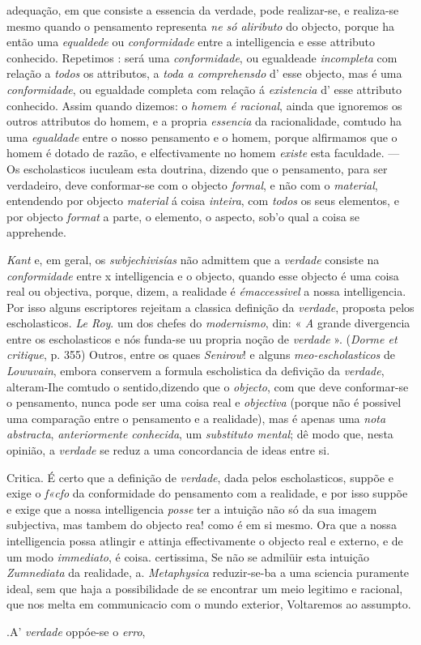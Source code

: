 adequação, em que consiste a essencia da verdade, pode realizar-se, e realiza-se mesmo quando o pensamento representa \emph{ne só aliributo} do objecto, porque ha então uma \emph{equaldede} ou \emph{conformidade} entre a intelligencia e esse attributo conhecido. Repetimos : será uma \emph{conformidade}, ou egualdeade \emph{incompleta} com relação a \emph{todos} os attributos, a \emph{toda a comprehensdo} d' esse objecto, mas é uma \emph{conformidade}, ou egualdade completa com relação á \emph{existencia} d' esse attributo conhecido. Assim quando dizemos: o \emph{homem é racional}, ainda que ignoremos os outros attributos do homem, e a propria \emph{essencia} da racionalidade, comtudo ha uma \emph{egualdade} entre o nosso pensamento e o homem, porque alfirmamos que o homem é dotado de razão, e elfectivamente no homem \emph{existe} esta faculdade. --- Os escholasticos iuculeam esta doutrina, dizendo que o pensamento, para ser verdadeiro, deve conformar-se com o objecto \emph{formal}, e não com o \emph{material}, entendendo por objecto \emph{material} á coisa \emph{inteira}, com \emph{todos} os seus elementos, e por objecto \emph{format} a parte, o elemento, o aspecto, sob'o qual a coisa se apprehende.\par \emph{Kant} e, em geral, os \emph{swbjechivisías} não admittem que a \emph{verdade} consiste na \emph{conformidade} entre x intelligencia e o objecto, quando esse objecto é uma coisa real ou objectiva, porque, dizem, a realidade é \emph{émaccessivel} a nossa intelligencia. Por isso alguns escriptores rejeitam a classica definição da \emph{verdade}, proposta pelos escholasticos. \emph{Le Roy}. um dos chefes do \emph{modernismo}, din: « \emph{A} grande divergencia entre os escholasticos e nós funda-se uu propria noção de \emph{verdade} ». (\emph{Dorme et critique}, p. 355) Outros, entre os quaes \emph{Senirow}! e alguns \emph{meo-escholasticos} de \emph{Lowuvain}, embora conservem a formula escholistica da defivição da \emph{verdade}, alteram-Ihe comtudo o sentido,dizendo que o \emph{objecto}, com que deve conformar-se o pensamento, nunca pode ser uma coisa real e \emph{objectiva} (porque não é possivel uma comparação entre o pensamento e a realidade), mas é apenas uma \emph{nota abstracta}, \emph{anteriormente conhecida}, um \emph{substituto mental}; dê modo que, nesta opinião, a \emph{verdade} se reduz a uma concordancia de ideas entre si.\par Critica. É certo que a definição de \emph{verdade}, dada pelos escholasticos, suppõe e exige o \emph{f«cfo} da conformidade do pensamento com a realidade, e por isso suppõe e exige que a nossa intelligencia \emph{posse} ter a intuição não só da sua imagem subjectiva, mas tambem do objecto rea! como é em si mesmo. Ora que a nossa intelligencia possa atlingir e attinja effectivamente o objecto real e externo, e de um modo \emph{immediato}, é coisa. certissima, Se não se admilüir esta intuição \emph{Zumnediata} da realidade, a. \emph{Metaphysica} reduzir-se-ba a uma sciencia puramente ideal, sem que haja a possibilidade de se encontrar um meio legitimo e racional, que nos melta em communicacio com o mundo exterior, Voltaremos ao assumpto.\par .A' \emph{verdade} oppóe-se o \emph{erro}, 